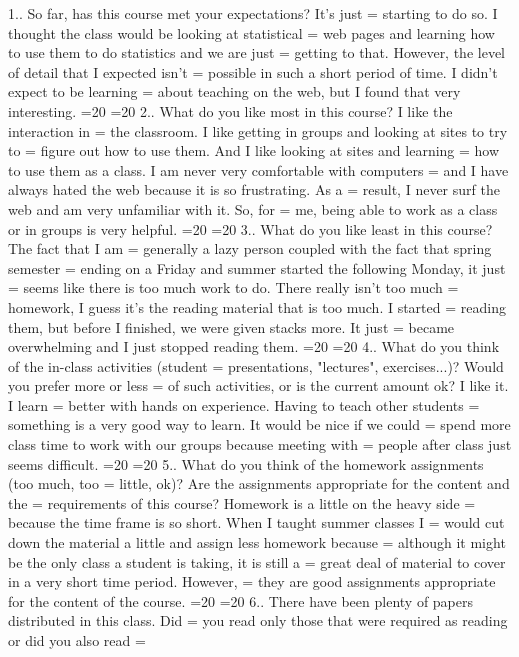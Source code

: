     1.. So far, has this course met your expectations? It's just =
starting to do so.  I thought the class would be looking at statistical =
web pages and learning how to use them to do statistics and we are just =
getting to that.  However, the level of detail that I expected isn't =
possible in such a short period of time.  I didn't expect to be learning =
about teaching on the web, but I found that very interesting.
   =20
   =20
    2.. What do you like most in this course? I like the interaction in =
the classroom.  I like getting in groups and looking at sites to try to =
figure out how to use them.  And I like looking at sites and learning =
how to use them as a class.  I am never very comfortable with computers =
and I have always hated the web because it is so frustrating.  As a =
result, I never surf the web and am very unfamiliar with it.  So, for =
me, being able to work as a class or in groups is very helpful.
   =20
   =20
    3.. What do you like least in this course? The fact that I am =
generally a lazy person coupled with the fact that spring semester =
ending on a Friday and summer started the following Monday, it just =
seems like there is too much work to do.  There really isn't too much =
homework, I guess it's the reading material that is too much.  I started =
reading them, but before I finished, we were given stacks more.  It just =
became overwhelming and I just stopped reading them.
   =20
   =20
    4.. What do you think of the in-class activities (student =
presentations, "lectures", exercises...)? Would you prefer more or less =
of such activities, or is the current amount ok?  I like it.  I learn =
better with hands on experience.  Having to teach other students =
something is a very good way to learn.  It would be nice if we could =
spend more class time to work with our groups because meeting with =
people after class just seems difficult.
   =20
   =20
    5.. What do you think of the homework assignments (too much, too =
little, ok)? Are the assignments appropriate for the content and the =
requirements of this course?  Homework is a little on the heavy side =
because the time frame is so short.  When I taught summer classes I =
would cut down the material a little and assign less homework because =
although it might be the only class a student is taking, it is still a =
great deal of material to cover in a very short time period.  However, =
they are good assignments appropriate for the content of the course.
   =20
   =20
    6.. There have been plenty of papers distributed in this class. Did =
you read only those that were required as reading or did you also read =

